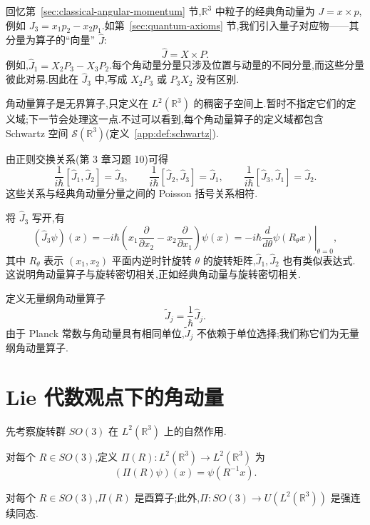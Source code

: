 回忆第~\ref{sec:classical-angular-momentum} 节,$\mathbb R^3$ 中粒子的经典角动量为 $J=x\times p$,例如 $J_3=x_1p_2-x_2p_1$.如第~\ref{sec:quantum-axioms} 节,我们引入量子对应物——其分量为算子的“向量” $\widehat J$:
\[
\widehat J=X\times P.
\]
例如,$\widehat J_1=X_2P_3-X_3P_2$.每个角动量分量只涉及位置与动量的不同分量,而这些分量彼此对易.因此在 $\widehat J_3$ 中,写成 $X_2P_3$ 或 $P_3X_2$ 没有区别.

角动量算子是无界算子,只定义在 $L^2(\mathbb R^3)$ 的稠密子空间上.暂时不指定它们的定义域;下一节会处理这一点.不过可以看到,每个角动量算子的定义域都包含 Schwartz 空间 $\mathcal S(\mathbb R^3)$(定义~\ref{app:def:schwartz}).

由正则交换关系(第 3 章习题 10)可得
\[
\frac1{i\hbar}[\widehat J_1,\widehat J_2]=\widehat J_3,
\qquad
\frac1{i\hbar}[\widehat J_2,\widehat J_3]=\widehat J_1,
\qquad
\frac1{i\hbar}[\widehat J_3,\widehat J_1]=\widehat J_2.
\label{eq:angular-momentum-commutators}
\]
这些关系与经典角动量分量之间的 Poisson 括号关系相符.

将 $\widehat J_3$ 写开,有
\[
(\widehat J_3\psi)(x)=-i\hbar\left(x_1\frac{\partial}{\partial x_2}-x_2\frac{\partial}{\partial x_1}\right)\psi(x)
=-i\hbar\left.\frac{d}{d\theta}\psi(R_\theta x)\right|_{\theta=0},
\label{eq:j3-rotation-derivative}
\]
其中 $R_\theta$ 表示 $(x_1,x_2)$ 平面内逆时针旋转 $\theta$ 的旋转矩阵,$\widehat J_1,\widehat J_2$ 也有类似表达式.这说明角动量算子与旋转密切相关,正如经典角动量与旋转密切相关.

定义无量纲角动量算子
\[
\widetilde J_j=\frac1\hbar\widehat J_j.
\label{eq:dimensionless-angular-momentum}
\]
由于 Planck 常数与角动量具有相同单位,$\widetilde J_j$ 不依赖于单位选择;我们称它们为无量纲角动量算子.

\section{Lie 代数观点下的角动量}
\label{sec:angular-momentum-lie-algebra}

先考察旋转群 $SO(3)$ 在 $L^2(\mathbb R^3)$ 上的自然作用.

\begin{definition}[旋转群的自然表示]\label{def:rotation-representation}
对每个 $R\in SO(3)$,定义 $\Pi(R):L^2(\mathbb R^3)\to L^2(\mathbb R^3)$ 为
\[
(\Pi(R)\psi)(x)=\psi(R^{-1}x).
\label{eq:rotation-representation}
\]
\end{definition}

\begin{proposition}[旋转的酉表示]\label{prop:rotation-unitary-representation}
对每个 $R\in SO(3)$,$\Pi(R)$ 是酉算子;此外,$\Pi:SO(3)\to U(L^2(\mathbb R^3))$ 是强连续同态.
\end{proposition}

